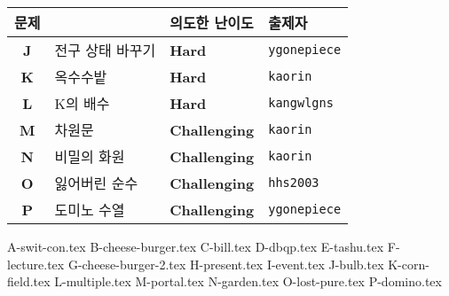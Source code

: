     \begin{frame} %
        \begin{center}
            \begin{tabular}{cl|l|l}
                \hline
                문제 & & 의도한 난이도 & 출제자 \\
                \hline
                \hline
                \textbf{J} & 전구 상태 바꾸기 & \textbf{\color{acgold}Hard} & \texttt{ygonepiece} \\
                \textbf{K} & 옥수수밭 & \textbf{\color{acgold}Hard} & \texttt{kaorin} \\
                \textbf{L} & K의 배수 & \textbf{\color{acgold}Hard} & \texttt{kangwlgns} \\
                \textbf{M} & 차원문 & \textbf{\color{acgold}Challenging} & \texttt{kaorin} \\
                \textbf{N} & 비밀의 화원 & \textbf{\color{acplatinum}Challenging} & \texttt{kaorin} \\
                \textbf{O} & 잃어버린 순수 & \textbf{\color{acplatinum}Challenging} & \texttt{hhs2003} \\
                \textbf{P} & 도미노 수열 & \textbf{\color{acdiamond}Challenging} & \texttt{ygonepiece} \\
                \hline
            \end{tabular}
        \end{center}
    \end{frame}
    
    {A-swit-con.tex}
    {B-cheese-burger.tex}
    {C-bill.tex}
    {D-dbqp.tex}
    {E-tashu.tex}
    {F-lecture.tex}
    {G-cheese-burger-2.tex}
    {H-present.tex}
    {I-event.tex}
    {J-bulb.tex}
    {K-corn-field.tex}
    {L-multiple.tex}
    {M-portal.tex}
    {N-garden.tex}
    {O-lost-pure.tex}
    {P-domino.tex}
